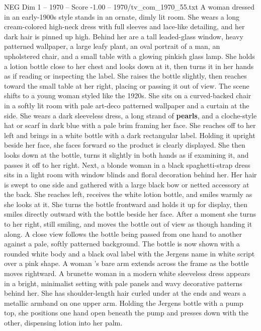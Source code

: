 \begin{textsample}{NEG Dim 1 – 1970 – Score -1.00 – 1970/tv\_com\_1970\_55.txt}  \label{ex:f1_neg_034}
A woman dressed in an early-1900s style stands in an ornate, dimly lit room.
She wears a long cream-colored high-neck dress with full sleeves and lace-like detailing, and her dark hair is pinned up high.
Behind her are a tall leaded-glass window, heavy patterned wallpaper, a large leafy plant, an oval portrait of a man, an upholstered chair, and a small table with a glowing pinkish glass lamp.
She holds a lotion bottle close to her chest and looks down at it, then turns it in her hands as if reading or inspecting the label.
She raises the bottle slightly, then reaches toward the small table at her right, placing or passing it out of view.
The scene shifts to a young woman styled like the 1920s.
She sits on a curved-backed chair in a softly lit room with pale art-deco patterned wallpaper and a curtain at the side.
She wears a dark sleeveless dress, a long strand of \textbf{pearls}, and a cloche-style hat or scarf in dark blue with a pale brim framing her face.
She reaches off to her left and brings in a white bottle with a dark rectangular label.
Holding it upright beside her face, she faces forward so the product is clearly displayed.
She then looks down at the bottle, turns it slightly in both hands as if examining it, and passes it off to her right.
Next, a blonde woman in a black spaghetti-strap dress sits in a light room with window blinds and floral decoration behind her.
Her hair is swept to one side and gathered with a large black bow or netted accessory at the back.
She reaches left, receives the white lotion bottle, and smiles warmly as she looks at it.
She turns the bottle frontward and holds it up for display, then smiles directly outward with the bottle beside her face.
After a moment she turns to her right, still smiling, and moves the bottle out of view as though handing it along.
A close view follows the bottle being passed from one hand to another against a pale, softly patterned background.
The bottle is now shown with a rounded white body and a black oval label with the Jergens name in white script over a pink shape.
A woman ’s bare arm extends across the frame as the bottle moves rightward.
A brunette woman in a modern white sleeveless dress appears in a bright, minimalist setting with pale panels and wavy decorative patterns behind her.
She has shoulder-length hair curled under at the ends and wears a metallic armband on one upper arm.
Holding the Jergens bottle with a pump top, she positions one hand open beneath the pump and presses down with the other, dispensing lotion into her palm.

\end{textsample}
